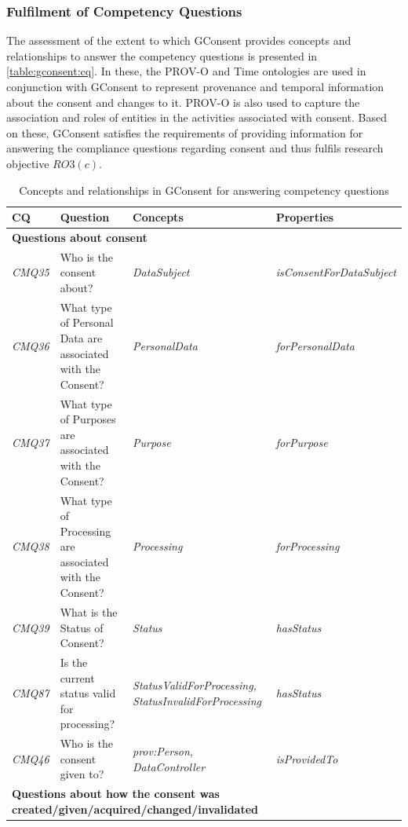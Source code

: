 \subsubsection{Fulfilment of Competency Questions}
The assessment of the extent to which GConsent provides concepts and relationships to answer the competency questions is presented in \autoref{table:gconsent:cq}. 
In these, the PROV-O and Time ontologies are used in conjunction with GConsent to represent provenance and temporal information about the consent and changes to it.
PROV-O is also used to capture the association and roles of entities in the activities associated with consent.
Based on these, GConsent satisfies the requirements of providing information for answering the compliance questions regarding consent and thus fulfils research objective $RO3(c)$.
\begin{table}[htbp]
\footnotesize
\centering
{}
\begin{tabularx}{\textwidth}{|p{1cm}|X|p{4cm}|p{3.5cm}|}
\caption{Concepts and relationships in GConsent for answering competency questions} \\ \hline
\label{table:gconsent:cq}
\textbf{CQ} & \textbf{Question} & \textbf{Concepts} & \textbf{Properties} \\ \hline
\multicolumn{4}{|l|}{\textbf{Questions about consent}} \\ \hline
\textit{CMQ35} & Who is the consent about? & \textit{DataSubject} & \textit{isConsentForDataSubject} \\ \hline
\textit{CMQ36} & What type of Personal Data are associated with the Consent? & \textit{PersonalData} & \textit{forPersonalData} \\ \hline
\textit{CMQ37} & What type of Purposes are associated with the Consent? & \textit{Purpose} & \textit{forPurpose} \\ \hline
\textit{CMQ38} & What type of Processing are associated with the Consent? & \textit{Processing} & \textit{forProcessing} \\ \hline
\textit{CMQ39} & What is the Status of Consent? & \textit{Status} & \textit{hasStatus} \\ \hline
\textit{CMQ87} & Is the current status valid for processing? & \textit{StatusValidForProcessing, StatusInvalidForProcessing} & \textit{hasStatus} \\ \hline
\textit{CMQ46} & Who is the consent given to? & \textit{prov:Person, DataController} & \textit{isProvidedTo} \\ \hline
\multicolumn{4}{|l|}{\textbf{Questions about how the consent was created/given/acquired/changed/invalidated}} \\ \hline

\end{tabularx}
\end{table}
